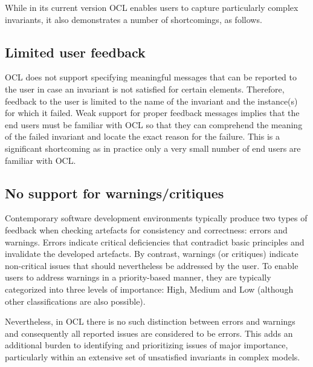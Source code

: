 While in its current version OCL enables users to capture particularly complex invariants, it also demonstrates a number of shortcomings, as follows.

\subsection{Limited user feedback}
\label{sec:Issue1}
OCL does not support specifying meaningful messages that can be reported to the user in case an invariant is not satisfied for certain elements. Therefore, feedback to the user is limited to the name of the invariant and the instance(s) for which it failed. Weak support for proper feedback messages implies that the end users must be familiar with OCL so that they can comprehend the meaning of the failed invariant and locate the exact reason for the failure. This is a significant shortcoming as in practice only a very small number of end users are familiar with OCL.

\subsection{No support for warnings/critiques}
\label{sec:Issue2}
Contemporary software development environments typically produce two types of feedback when checking artefacts for consistency and correctness: errors and warnings. Errors indicate critical deficiencies that contradict basic principles and invalidate the developed artefacts. By contrast, warnings (or critiques) indicate non-critical issues that should nevertheless be addressed by the user. To enable users to address warnings in a priority-based manner, they are typically categorized into three levels of importance: High, Medium and Low (although other classifications are also possible).

Nevertheless, in OCL there is no such distinction between errors and warnings and consequently all reported issues are considered to be errors. This adds an additional burden to identifying and prioritizing issues of major importance, particularly within an extensive set of unsatisfied invariants in complex models.


